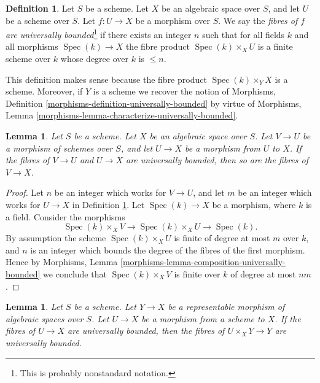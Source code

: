 \documentclass{stacks-project}
\theoremstyle{plain}
\newtheorem{lemma}[subsection]{Lemma}
\theoremstyle{definition}
\newtheorem{definition}[subsection]{Definition}
\theoremstyle{remark}
\numberwithin{equation}{subsection}
\def\Spec{\mathop{\mathrm{Spec}}}
\begin{document}
\begin{definition}
\label{definition-universally-bounded}
Let $S$ be a scheme. Let $X$ be an algebraic space over $S$, and
let $U$ be a scheme over $S$. Let $f : U \to X$ be a morphism over $S$.
We say the {\it fibres of $f$ are universally bounded}\footnote{This is
probably nonstandard notation.}
if there exists an integer $n$ such that for all fields
$k$ and all morphisms $\Spec(k) \to X$ the fibre
product $\Spec(k) \times_X U$ is a finite scheme over $k$
whose degree over $k$ is $\leq n$.
\end{definition}

\noindent
This definition makes sense because the fibre product
$\Spec(k) \times_Y X$ is a scheme. Moreover, if $Y$ is a scheme
we recover the notion of
Morphisms, Definition \ref{morphisms-definition-universally-bounded}
by virtue of
Morphisms, Lemma \ref{morphisms-lemma-characterize-universally-bounded}.

\begin{lemma}
\label{lemma-composition-universally-bounded}
Let $S$ be a scheme. Let $X$ be an algebraic space over $S$.
Let $V \to U$ be a morphism of schemes over $S$, and let
$U \to X$ be a morphism from $U$ to $X$. If the fibres of
$V \to U$ and $U \to X$ are universally bounded, then so
are the fibres of $V \to X$.
\end{lemma}

\begin{proof}
Let $n$ be an integer which works for $V \to U$, and let $m$ be
an integer which works for $U \to X$ in
Definition \ref{definition-universally-bounded}.
Let $\Spec(k) \to X$ be a morphism, where $k$ is a field.
Consider the morphisms
$$
\Spec(k) \times_X V
\longrightarrow
\Spec(k) \times_X U
\longrightarrow
\Spec(k).
$$
By assumption the scheme $\Spec(k) \times_X U$
is finite of degree at most $m$ over $k$, and $n$ is an integer which
bounds the degree of the fibres of the first morphism. Hence by
Morphisms, Lemma \ref{morphisms-lemma-composition-universally-bounded}
we conclude that $\Spec(k) \times_X V$ is finite over $k$
of degree at most $nm$.
\end{proof}

\begin{lemma}
\label{lemma-base-change-universally-bounded}
Let $S$ be a scheme.
Let $Y \to X$ be a representable morphism of algebraic spaces over $S$.
Let $U \to X$ be a morphism from a scheme to $X$.
If the fibres of $U \to X$ are universally bounded, then the fibres
of $U \times_X Y \to Y$ are universally bounded.
\end{lemma}
\end{document}

